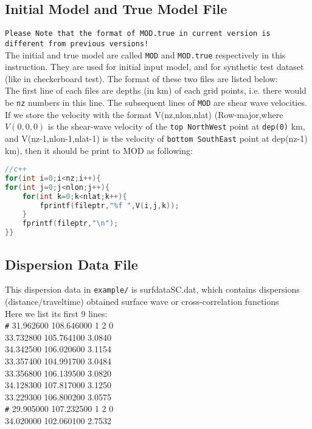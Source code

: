 \documentclass[UTF8]{article}
\begin{document}
\subsection{Initial Model and True Model File}
\texttt{Please Note that the format of MOD.true in current version 
is different from previous versions!} \\ 

The initial and true model are called \verb!MOD! 
and \verb!MOD.true! respectively in this instruction. 
They are used for initial input model, 
and for synthetic test dataset (like in checkerboard test). 
The format of these two files are listed below: \\

The first line of each files are depths (in km) of each grid points,
i.e. there would be \texttt{nz} numbers in this line. 
The subsequent lines of \verb!MOD! are shear wave velocities.
If we store the velocity with the format V(nz,nlon,nlat)
(Row-major,where $V(0,0,0)$ is the shear-wave velocity of the 
\texttt{top NorthWest} point at \texttt{dep(0)} km, and V(nz-1,nlon-1,nlat-1) is 
the velocity of \texttt{bottom SouthEast} point at dep(nz-1) km), then it 
should be print to MOD as following:
\begin{lstlisting}[language=c++]
//c++
for(int i=0;i<nz;i++){
for(int j=0;j<nlon;j++){
    for(int k=0;k<nlat;k++){
        fprintf(fileptr,"%f ",V(i,j,k));
    }
    fprintf(fileptr,"\n");
}} 
\end{lstlisting}

\subsection{Dispersion Data File}
This dispersion data in \verb!example/! is surfdataSC.dat,
which contains dispersions (distance/traveltime) obtained
surface wave or cross-correlation functions\\
Here we list its first 9 lines:\\
\verb!#!  31.962600 108.646000 1 2 0\\
33.732800 105.764100 3.0840\\
34.342500 106.020600 3.1154\\
33.357400 104.991700 3.0484\\
33.356800 106.139500 3.0820\\
34.128300 107.817000 3.1250\\
33.229300 106.800200 3.0575\\
\verb!#! 29.905000 107.232500 1 2 0\\
34.020000 102.060100 2.7532\\
\end{document}
